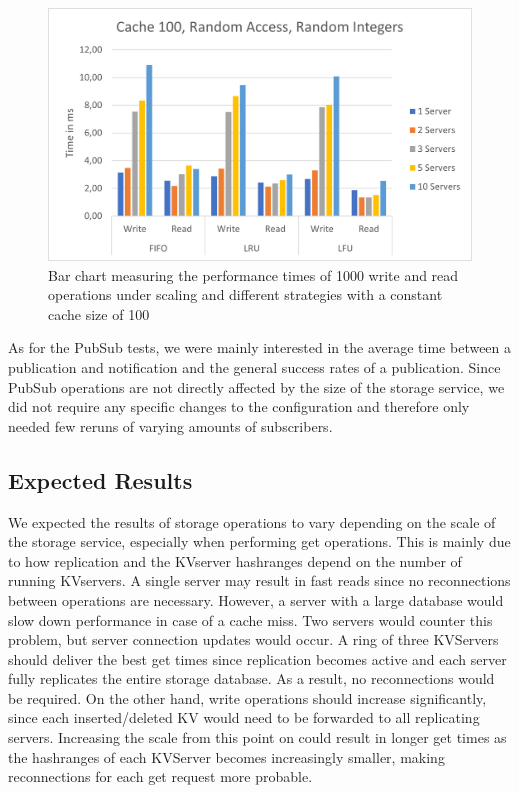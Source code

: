 \documentclass[sigconf]{acmart}
\begin{document}
\begin{center}
  \begin{figure}[htbp]
    \centerline{\includegraphics[scale=0.575]{attachments/RandomIntCache100.png}}
    \caption{Bar chart measuring the performance times of 1000 write and read operations under scaling and different strategies with a constant cache size of 100}
    \label{Cache 100}
  \end{figure}
\end{center}



As for the PubSub tests, we were mainly interested in the average time between a publication and notification and the general success rates of a publication. Since PubSub operations are not directly affected by the size of the storage service, we did not require any specific changes to the configuration and therefore only needed few reruns of varying amounts of subscribers. 

\subsection{Expected Results}\label{result-expectation}
We expected the results of storage operations to vary depending on the scale of the storage service, especially when performing get operations. This is mainly due to how replication and the KVserver hashranges depend on the number of running KVservers. A single server may result in fast reads since no reconnections between operations are necessary. However, a server with a large database would slow down performance in case of a cache miss. Two servers would counter this problem, but server connection updates would occur. A ring of three KVServers should deliver the best get times since replication becomes active and each server fully replicates the entire storage database. As a result, no reconnections would be required. On the other hand, write operations should increase significantly, since each inserted/deleted KV would need to be forwarded to all replicating servers. Increasing the scale from this point on could result in longer get times as the hashranges of each KVServer becomes increasingly smaller, making reconnections for each get request more probable.
\end{document}
